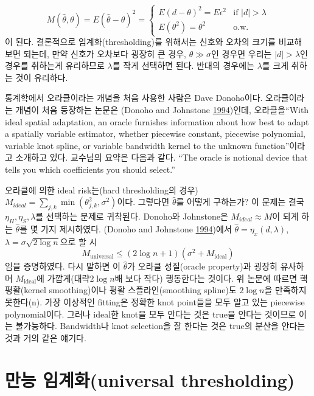\documentclass[b5paper,]{book}
\theoremstyle{definition}
\theoremstyle{definition}
\theoremstyle{definition}
\theoremstyle{remark}
\begin{document}
\[
M(\hat{\theta},\theta)=E(\hat{\theta}-\theta)^{2} =
\begin{cases}
E(d-\theta)^{2}=E\epsilon^{2} & \text{if $|d| > \lambda$}\\
E(\theta^{2})=\theta^{2} & \text{o.w.}
\end{cases}
\] 이 된다. 결론적으로 임계화(thresholding)를 위해서는 신호와 오차의
크기를 비교해 보면 되는데, 만약 신호가 오차보다 굉장히 큰 경우,
\(\theta \gg \sigma\)인 경우면 우리는 \(|d| > \lambda\)인 경우를
취하는게 유리하므로 \(\lambda\)를 작게 선택하면 된다. 반대의 경우에는
\(\lambda\)를 크게 취하는 것이 유리하다.

통계학에서 오라클이라는 개념을 처음 사용한 사람은 Dave Donoho이다.
오라클이라는 개념이 처음 등장하는 논문은 (Donoho and Johnstone
\protect\hyperlink{ref-Donoho1994}{1994})인데, 오라클을``With ideal
spatial adaptation, an oracle furnishes information about how best to
adapt a spatially variable estimator, whether piecewise constant,
piecewise polynomial, variable knot spline, or variable bandwidth kernel
to the unknown function''이라고 소개하고 있다. 교수님의 요약은 다음과
같다. ``The oracle is notional device that tells you which coefficients
you should select.''

오라클에 의한 ideal risk는(hard thresholding의 경우)
\(M_{ideal}=\sum_{j,k}\min(\theta_{j,k}^{2},\sigma^{2})\)이다. 그렇다면
\(\hat{\theta}\)를 어떻게 구하는가? 이 문제는 결국
\(\eta_{H}, \eta_{S}, \lambda\)를 선택하는 문제로 귀착된다. Donoho와
Johnstone은 \(M_{ideal}\approx M\)이 되게 하는 \(\hat{\theta}\)를 몇
가지 제시하였다. (Donoho and Johnstone
\protect\hyperlink{ref-Donoho1994}{1994})에서
\(\hat{\theta}=\eta_{x}(d,\lambda)\),
\(\lambda=\sigma\sqrt{2\log n}\)으로 할 시
\[M_{\text{universal}}\leq(2\log n +1)(\sigma^{2}+M_{\text{ideal}})\]
임을 증명하였다. 다시 말하면 이 \(\hat{\theta}\)가 오라클 성질(oracle
property)과 굉장히 유사하며 \(M_{\text{ideal}}\)에
가깝게(대략\(2\log n\)배 보다 작다) 행동한다는 것이다. 위 논문에 따르면
핵평활(kernel smoothing)이나 평활 스플라인(smoothing spline)도
\(2\log n\)을 만족하지 못한다(n). 가장 이상적인 fitting은 정확한 knot
point들을 모두 알고 있는 piecewise polynomial이다. 그러나 ideal한 knot을
모두 안다는 것은 true을 안다는 것이므로 이는 불가능하다. Bandwidth나
knot selection을 잘 한다는 것은 true의 분산을 안다는 것과 거의 같은
얘기다.

\section{만능 임계화(universal
thresholding)}\label{-universal-thresholding}
\end{document}
